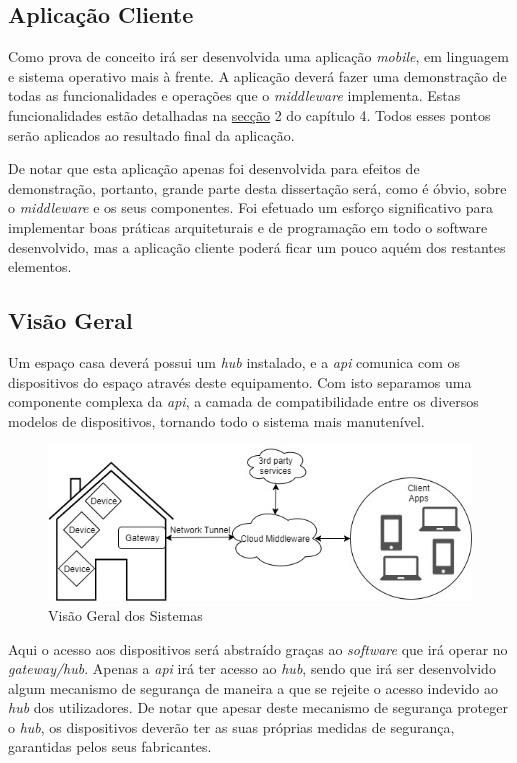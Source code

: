 \subsection{Aplicação Cliente}

Como prova de conceito irá ser desenvolvida uma aplicação \textit{mobile}, em linguagem e sistema operativo mais à frente. A aplicação deverá fazer uma demonstração de todas as funcionalidades e operações que o \textit{middleware} implementa. Estas funcionalidades estão detalhadas na \hyperref[sec:funcionalidades]{secção} 2 do capítulo 4. Todos esses pontos serão aplicados ao resultado final da aplicação.

De notar que esta aplicação apenas foi desenvolvida para efeitos de demonstração, portanto, grande parte desta dissertação será, como é óbvio, sobre o \textit{middleware} e os seus componentes. Foi efetuado um esforço significativo para implementar boas práticas arquiteturais e de programação em todo o software desenvolvido, mas a aplicação cliente poderá ficar um pouco aquém dos restantes elementos. 

\subsection{Visão Geral}

Um espaço casa deverá possui um \textit{hub} instalado, e a \textit{api} comunica com os dispositivos do espaço através deste equipamento. Com isto separamos uma componente complexa da \textit{api}, a camada de compatibilidade entre os diversos modelos de dispositivos, tornando todo o sistema mais manutenível. 

\begin{figure}[H]
  \centering
        \includegraphics[scale=0.7]{img/arquitetura.jpg}
  \caption{Visão Geral dos Sistemas}
\end{figure}

Aqui o acesso aos dispositivos será abstraído graças ao \textit{software} que irá operar no \textit{gateway/hub}. Apenas a \textit{api} irá ter acesso ao \textit{hub}, sendo que irá ser desenvolvido algum mecanismo de segurança de maneira a que se rejeite o acesso indevido ao \textit{hub} dos utilizadores. De notar que apesar deste mecanismo de segurança proteger o \textit{hub}, os dispositivos deverão ter as suas próprias medidas de segurança, garantidas pelos seus fabricantes.

